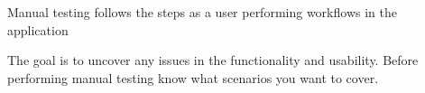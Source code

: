 Manual testing follows the steps as a user performing workflows in the application

The goal is to uncover any issues in the functionality and usability.
Before performing manual testing know what scenarios you want to cover.